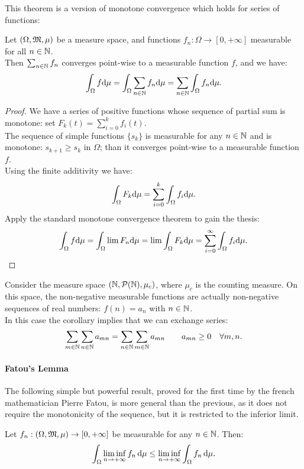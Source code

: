 This theorem is a version of monotone convergence which holds for series of functions:
\begin{coro} \label{theo-beppo-series}
	Let $(\Omega, \mathfrak M, \mu)$ be a measure space, and functions $f_n: \Omega \to \left[0, +\infty\right]$ measurable for all $n \in \mathbb N$. \\
	Then $\sum_{n\in\mathbb N}f_n$ converges point-wise to a measurable function $f$, and we have:
	$$\int_\Omega f \mathrm d\mu=\int_\Omega \sum_{n\in\mathbb N} f_n \mathrm d\mu = \sum_{n\in\mathbb N} \int_\Omega f_n \mathrm d\mu.$$
\end{coro}
\begin{proof}
	We have a series of positive functions whose sequence of partial sum is monotone: set $F_k(t) = \sum_{i=0}^{k} f_i(t)$.\\
	The sequence of simple functions $\{s_k\}$ is measurable for any $n\in \mathbb N$ and is monotone: $s_{k+1} \geq s_k$ in $\Omega$; than it converges point-wise to a measurable function $f$.\\
	Using the finite additivity we have:
	$$\int_\Omega F_k \mathrm d \mu = \sum_{i=0}^k \int_\Omega f_i \mathrm d \mu.$$
	Apply the standard monotone convergence theorem to gain the thesis:
	$$ 
		\int_\Omega f \mathrm d \mu 
		= \int_\Omega \lim\limits F_n \mathrm d \mu 
		= \lim\limits \int_\Omega F_k \mathrm d \mu 
		= \sum_{i=0}^\infty \int_\Omega f_i \mathrm d \mu
	.
	$$
\end{proof}

Consider the measure space $(\mathbb N, \mathcal P(\mathbb N), \mu_c)$, where $\mu_c$ is the counting measure. On this space, the non-negative measurable functions are actually non-negative sequences of real numbers: $f(n)=a_n$ with $n \in \mathbb N$. \\
In this case the corollary implies that we can exchange series:
	$$\sum_{m\in \mathbb N}\sum_{n\in \mathbb N} a_{mn}
	= \sum_{n\in \mathbb N}\sum_{m\in \mathbb N} a_{mn}
	\qquad a_{mn}\geq 0 \quad \forall m, n.
	$$

\paragraph{Fatou's Lemma} The following simple but powerful result, proved for the first time by the french mathematician Pierre Fatou, is more general than the previous, as it does not require the monotonicity of the sequence, but it is restricted to the inferior limit.

\begin{theo}\label{fatou-lemma}
	Let $f_n : (\Omega, \mathfrak M, \mu) \to \left[0, +\infty\right]$ be measurable for any $n \in \mathbb N$. Then:
	$$\int_\Omega \liminf_{n \to +\infty} f_n \,\mathrm d\mu \leq \liminf_{n \to +\infty} \int_\Omega f_n \,\mathrm d\mu.$$
\end{theo}

